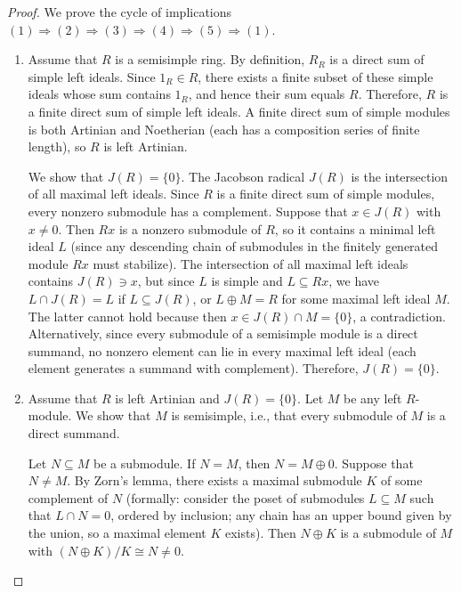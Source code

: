 \begin{proof}
    We prove the cycle of implications $(1) \Rightarrow (2) \Rightarrow (3) \Rightarrow (4) \Rightarrow (5) \Rightarrow (1)$.

    \begin{enumerate}
        \item Assume that $R$ is a semisimple ring. By definition, $R_R$ is a direct sum of simple left ideals. Since $1_R \in R$, there exists a finite subset of these simple ideals whose sum contains $1_R$, and hence their sum equals $R$. Therefore, $R$ is a finite direct sum of simple left ideals. A finite direct sum of simple modules is both Artinian and Noetherian (each has a composition series of finite length), so $R$ is left Artinian.

        We show that $J(R) = \{0\}$. The Jacobson radical $J(R)$ is the intersection of all maximal left ideals. Since $R$ is a finite direct sum of simple modules, every nonzero submodule has a complement. Suppose that $x \in J(R)$ with $x \neq 0$. Then $Rx$ is a nonzero submodule of $R$, so it contains a minimal left ideal $L$ (since any descending chain of submodules in the finitely generated module $Rx$ must stabilize). The intersection of all maximal left ideals contains $J(R) \ni x$, but since $L$ is simple and $L \subseteq Rx$, we have $L \cap J(R) = L$ if $L \subseteq J(R)$, or $L \oplus M = R$ for some maximal left ideal $M$. The latter cannot hold because then $x \in J(R) \cap M = \{0\}$, a contradiction. Alternatively, since every submodule of a semisimple module is a direct summand, no nonzero element can lie in every maximal left ideal (each element generates a summand with complement). Therefore, $J(R) = \{0\}$.

        \item Assume that $R$ is left Artinian and $J(R) = \{0\}$. Let $M$ be any left $R$-module. We show that $M$ is semisimple, i.e., that every submodule of $M$ is a direct summand.

        Let $N \subseteq M$ be a submodule. If $N = M$, then $N = M \oplus 0$. Suppose that $N \neq M$. By Zorn's lemma, there exists a maximal submodule $K$ of some complement of $N$ (formally: consider the poset of submodules $L \subseteq M$ such that $L \cap N = 0$, ordered by inclusion; any chain has an upper bound given by the union, so a maximal element $K$ exists). Then $N \oplus K$ is a submodule of $M$ with $(N \oplus K) / K \cong N \neq 0$.


\end{enumerate}
\end{proof}
